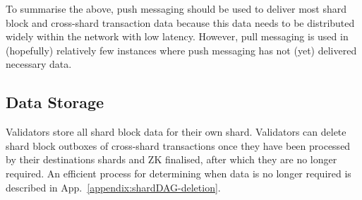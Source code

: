 To summarise the above, push messaging should be used to deliver most shard block and cross-shard transaction data because this data needs to be distributed widely within the network with low latency. However, pull messaging is used in (hopefully) relatively few instances where push messaging has not (yet) delivered necessary data.


\subsection{Data Storage}
\label{section:shardDAG-data-storage}
Validators store all shard block data for their own shard.
Validators can delete shard block outboxes of cross-shard transactions once they have been processed by their destinations shards and ZK finalised, after which they are no longer required.
An efficient process for determining when data is no longer required is described in App.~\ref{appendix:shardDAG-deletion}.



